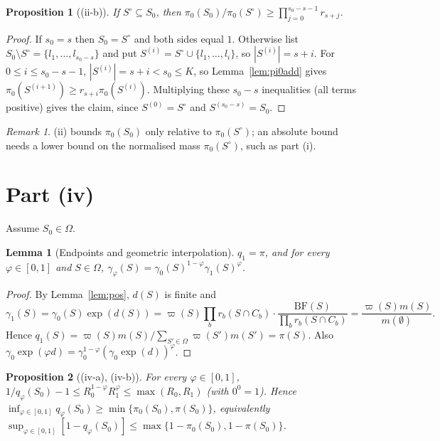\documentclass[11pt]{article}
\newtheorem{lemma}{Lemma}
\newtheorem{proposition}{Proposition}
\theoremstyle{remark}
\newtheorem{remark}{Remark}
\begin{document}
\begin{proposition}[(ii-b)]
If $S^\circ\subseteq S_0$, then $\pi_0(S_0)/\pi_0(S^\circ)\ge\prod_{j=0}^{s_0-s-1}r_{s+j}$.
\end{proposition}

\begin{proof}
If $s_0=s$ then $S_0=S^\circ$ and both sides equal $1$. Otherwise list $S_0\setminus S^\circ=\{l_1,\dots,l_{s_0-s}\}$ and put $S^{(i)}=S^\circ\cup\{l_1,\dots,l_i\}$, so $|S^{(i)}|=s+i$. For $0\le i\le s_0-s-1$, $|S^{(i)}|=s+i<s_0\le K$, so Lemma~\ref{lem:pi0add} gives $\pi_0(S^{(i+1)})\ge r_{s+i}\pi_0(S^{(i)})$. Multiplying these $s_0-s$ inequalities (all terms positive) gives the claim, since $S^{(0)}=S^\circ$ and $S^{(s_0-s)}=S_0$.
\end{proof}

\begin{remark}
(ii) bounds $\pi_0(S_0)$ only relative to $\pi_0(S^\circ)$; an absolute bound needs a lower bound on the normalised mass $\pi_0(S^\circ)$, such as part (i).
\end{remark}

\section{Part (iv)}

Assume $S_0\in\Omega$.

\begin{lemma}[Endpoints and geometric interpolation]\label{lem:bridge}
$q_1=\pi$, and for every $\varphi\in[0,1]$ and $S\in\Omega$, $\gamma_\varphi(S)=\gamma_0(S)^{1-\varphi}\gamma_1(S)^{\varphi}$.
\end{lemma}

\begin{proof}
By Lemma~\ref{lem:pos}, $d(S)$ is finite and
\[
\gamma_1(S)=\gamma_0(S)\exp(d(S))=\varpi(S)\prod_br_b(S\cap C_b)\cdot\frac{\mathrm{BF}(S)}{\prod_br_b(S\cap C_b)}=\frac{\varpi(S)m(S)}{m(\emptyset)} .
\] Hence $q_1(S)=\varpi(S)m(S)/\sum_{S'\in\Omega}\varpi(S')m(S')=\pi(S)$. Also $\gamma_0\exp(\varphi d)=\gamma_0^{1-\varphi}(\gamma_0\exp(d))^{\varphi}$.
\end{proof}

\begin{proposition}[(iv-a), (iv-b)]
For every $\varphi\in[0,1]$, $1/q_\varphi(S_0)-1\le R_0^{1-\varphi}R_1^{\varphi}\le\max(R_0,R_1)$ (with $0^0=1$). Hence $\inf_{\varphi\in[0,1]}q_\varphi(S_0)\ge\min\{\pi_0(S_0),\pi(S_0)\}$, equivalently $\sup_{\varphi\in[0,1]}[1-q_\varphi(S_0)]\le\max\{1-\pi_0(S_0),1-\pi(S_0)\}$.
\end{proposition}
\end{document}
